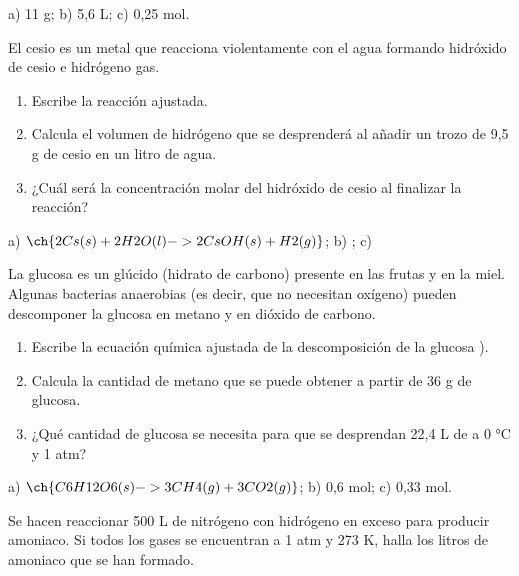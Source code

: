 \documentclass[
]{article}
\providecommand{\tightlist}{%
  \setlength{\itemsep}{0pt}\setlength{\parskip}{0pt}}
\begin{document}
\begin{solution}a) 11 g; b) 5,6 L; c) 0,25 mol.\end{solution}

\begin{exercise}[tags=SM16] El cesio es un metal que reacciona
violentamente con el agua formando hidróxido de cesio e hidrógeno gas.

\begin{enumerate}
\def\labelenumi{\alph{enumi})}
\tightlist
\item
  Escribe la reacción ajustada.
\item
  Calcula el volumen de hidrógeno que se desprenderá al añadir un trozo
  de 9,5 g de cesio en un litro de agua.
\item
  ¿Cuál será la concentración molar del hidróxido de cesio al finalizar
  la reacción?
\end{enumerate}

\end{exercise}

\begin{solution}a) \(\ch{2 Cs(s) + 2 H2O(l) -> 2 CsOH(s) + H2(g)}\); b)
; c)\end{solution}

\begin{exercise}[tags=SM16] La glucosa es un glúcido (hidrato de
carbono) presente en las frutas y en la miel. Algunas bacterias
anaerobias (es decir, que no necesitan oxígeno) pueden descomponer la
glucosa en metano y en dióxido de carbono.

\begin{enumerate}
\def\labelenumi{\alph{enumi})}
\tightlist
\item
  Escribe la ecuación química ajustada de la descomposición de la
  glucosa ).
\item
  Calcula la cantidad de metano que se puede obtener a partir de 36 g de
  glucosa.
\item
  ¿Qué cantidad de glucosa se necesita para que se desprendan 22,4 L de
   a 0 °C y 1 atm?
\end{enumerate}

\end{exercise}

\begin{solution}a) \(\ch{C6H12O6(s) -> 3 CH4(g) + 3 CO2(g)}\); b) 0,6
mol; c) 0,33 mol.\end{solution}

\begin{exercise}[tags=SM16] Se hacen reaccionar 500 L de nitrógeno con
hidrógeno en exceso para producir amoniaco. Si todos los gases se
encuentran a 1 atm y 273 K, halla los litros de amoniaco que se han
formado.\end{exercise}
\end{document}
